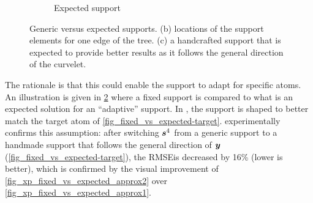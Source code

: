 \begin{figure}[!ht]
\begin{subfigure}[b]{0.32\textwidth}
	\caption{Expected support} \label{fig_fixed_vs_expected-expected}
\end{subfigure}
\caption{Generic versus expected supports. (b) locations of the support elements for one edge of the tree. (c) a handcrafted support that is expected to provide better results as it follows the general direction of the curvelet.}\label{fig_fixed_vs_expected}
\end{figure}

\noindent
The rationale is that this could enable the support to adapt for specific atoms. An illustration is given in \cref{fig_fixed_vs_expected} where a fixed support is compared to what is an expected solution for an “adaptive” support. In , the support is shaped to better match the target atom of \cref{fig_fixed_vs_expected-target}.  experimentally confirms this assumption: after switching $\bm{s}^4$ from a generic support to a handmade support that follows the general direction of $\bm{y}$ (\cref{fig_fixed_vs_expected-target}), the RMSE\footnotemark[1] is decreased by 16\% (lower is better), which is confirmed by the visual improvement of \cref{fig_xp_fixed_vs_expected_approx2} over \cref{fig_xp_fixed_vs_expected_approx1}.



